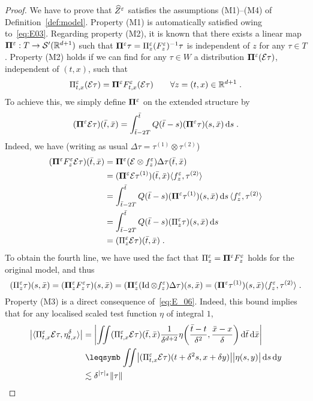 \documentclass[reqno,11pt]{article}
\def\bPi{\mathbf{\Pi}}
\DeclareMathOperator{\Id}{Id}
\def\abss#1{\abs{#1}_\mathfrak{s}}
\def\Zhat{\widehat Z}
\begin{document}
\begin{proof}
We have to prove that $\Zhat^\eps$ satisfies the assumptions (M1)--(M4) of
Definition~\ref{def:model}. Property (M1) is automatically satisfied owing 
to~\eqref{eq:E03}. Regarding property (M2), it is known
\cite[Sec.~8.3]{Hairer2014} that there exists a linear map
$\bPi^\eps:T\rightarrow \cS'(\R^{d+1})$ such that
$\bPi^\eps\tau=\Pi^\eps_z(F^\eps_z)^{-1}\tau$ is independent of $z$ for any
$\tau\in T$. Property (M2) holds if we can find for any $\tau\in W$ a
distribution $\bPi^\eps(\cE\tau)$, independent of $(t,x)$, such that 
\[
 \Pi^\eps_{t,x}(\cE\tau) = \bPi^\eps F^\eps_{t,x}(\cE\tau) 
 \qquad \forall z=(t,x)\in \R^{d+1}\;.
\]
To achieve this, we simply define $\bPi^\eps$ on the extended structure by  
\[
 (\bPi^\eps\cE\tau)(\bar t,\bar x) 
 = \int_{\bar t-2T}^{\bar t} Q(\bar t-s) (\bPi^\eps\tau)(s,\bar x)\6s\;. 
\]
Indeed, we have (writing as usual $\Delta\tau=\tau^{(1)}\otimes\tau^{(2)}$) 
\begin{align*}
(\bPi^\eps F^\eps_z\cE\tau)(\bar t,\bar x) 
&= \bPi^\eps (\cE\otimes f^\eps_z)\Delta\tau
(\bar t,\bar x) \\
&= (\bPi^\eps\cE\tau^{(1)})(\bar t,\bar x) \pscal{f^\eps_z}{\tau^{(2)}} \\
&= \int_{\bar t-2T}^{\bar t} Q(\bar t-s) 
(\bPi^\eps\tau^{(1)})(s,\bar x)\6s \, \pscal{f^\eps_z}{\tau^{(2)}} \\
&= \int_{\bar t-2T}^{\bar t} Q(\bar t-s) (\Pi^\eps_z\tau)(s,\bar x)\6s \\ 
&= (\Pi^\eps_z\cE\tau)(\bar t,\bar x)\;.
\end{align*}
To obtain the fourth line, we have used the fact that $\Pi^\eps_z = \bPi^\eps
F^\eps_z$ holds for the original model, and thus 
\[
 (\Pi^\eps_z\tau)(s,\bar x) 
 = (\bPi^\eps_zF^\eps_z\tau)(s,\bar x)
 = (\bPi^\eps_z(\Id\otimes f^\eps_z)\Delta\tau)(s,\bar x)
 = (\bPi^\eps\tau^{(1)})(s,\bar x) \pscal{f^\eps_z}{\tau^{(2)}}\;.
\]
%
Property (M3) is a direct consequence of~\eqref{eq:E_06}. Indeed, this bound
implies that for any localised scaled test function $\eta$ of integral $1$, 
\begin{align*}
\bigabs{\pscal{\Pi^\eps_{t,x}\cE\tau}{\eta^\delta_{t,x}}}
&= \biggabs{\iint (\Pi^\eps_{t,x}\cE\tau)(\bar t,\bar x)
\frac{1}{\delta^{d+2}}
\eta\biggpar{\frac{\bar t-t}{\delta^2},\frac{\bar x-x}{\delta}}
\6\bar t\6\bar x} \\
&\leqs \iint \bigabs{(\Pi^\eps_{t,x}\cE\tau)(t+\delta^2s,x+\delta y)}
\bigabs{\eta(s,y)}\6s\6y \\
&\lesssim \delta^{\abss{\tau}} \norm{\tau}

\end{align*}
\end{proof}
\end{document}
